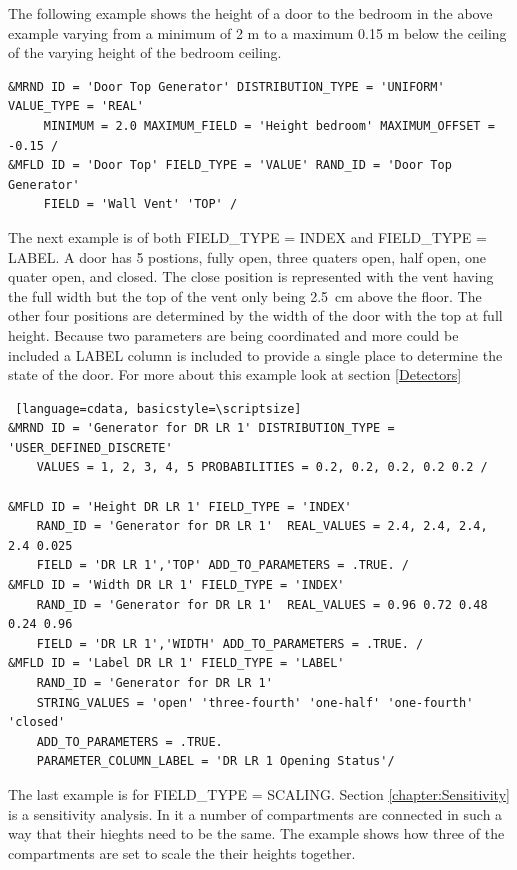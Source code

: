 \documentclass[12pt,twoside]{book}
\begin{document}
The following example shows the height of a door to the bedroom in the above example varying from a minimum of 2 m to a maximum 0.15 m below the ceiling of the varying height of the bedroom ceiling.

\begin{lstlisting}[language=cdata, basicstyle=\scriptsize]
&MRND ID = 'Door Top Generator' DISTRIBUTION_TYPE = 'UNIFORM' VALUE_TYPE = 'REAL'
     MINIMUM = 2.0 MAXIMUM_FIELD = 'Height bedroom' MAXIMUM_OFFSET = -0.15 /
&MFLD ID = 'Door Top' FIELD_TYPE = 'VALUE' RAND_ID = 'Door Top Generator'
     FIELD = 'Wall Vent' 'TOP' /
\end{lstlisting}

The next example is of both {\ct FIELD\_TYPE = INDEX} and {\ct FIELD\_TYPE = LABEL}. A door has 5 postions, fully open, three quaters open, half open, one quater open, and closed. The close position is represented with the vent having the full width but the top of the vent only being 2.5~cm above the floor. The other four positions are determined by the width of the door with the top at full height. Because two parameters are being coordinated and more could be included a {\ct LABEL} column is included to provide a single place to determine the state of the door. For more about this example look at section \ref{Detectors}

\vspace{\baselineskip}
\begin{lstlisting} [language=cdata, basicstyle=\scriptsize]
&MRND ID = 'Generator for DR LR 1' DISTRIBUTION_TYPE = 'USER_DEFINED_DISCRETE'
	VALUES = 1, 2, 3, 4, 5 PROBABILITIES = 0.2, 0.2, 0.2, 0.2 0.2 /

&MFLD ID = 'Height DR LR 1' FIELD_TYPE = 'INDEX' 
	RAND_ID = 'Generator for DR LR 1'  REAL_VALUES = 2.4, 2.4, 2.4, 2.4 0.025 
	FIELD = 'DR LR 1','TOP' ADD_TO_PARAMETERS = .TRUE. /
&MFLD ID = 'Width DR LR 1' FIELD_TYPE = 'INDEX' 
	RAND_ID = 'Generator for DR LR 1'  REAL_VALUES = 0.96 0.72 0.48 0.24 0.96 
	FIELD = 'DR LR 1','WIDTH' ADD_TO_PARAMETERS = .TRUE. /
&MFLD ID = 'Label DR LR 1' FIELD_TYPE = 'LABEL' 
	RAND_ID = 'Generator for DR LR 1' 
	STRING_VALUES = 'open' 'three-fourth' 'one-half' 'one-fourth' 'closed' 
	ADD_TO_PARAMETERS = .TRUE. 
	PARAMETER_COLUMN_LABEL = 'DR LR 1 Opening Status'/
\end{lstlisting}

The last example is for {\ct FIELD\_TYPE = SCALING}. Section \ref{chapter:Sensitivity} is a sensitivity analysis. In it a number of compartments are connected in such a way that their hieghts need to be the same. The example shows how three of the compartments are set to scale the their heights together. 
\end{document}
